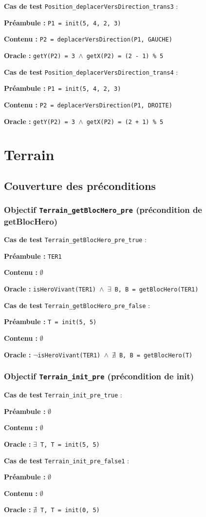 \documentclass{article}
\newcommand{\cmd}[1]{\texttt{#1}}
\newcommand{\lAND}{$\land$}
\newcommand{\lNOT}{$\lnot$}
\newcommand{\lEXISTS}{$\exists$}
\newcommand{\lNEXISTS}{$\nexists{}$}
\newcommand{\obj}[2]{\subsubsection*{\large{\textbf{Objectif {\cmd{#1} (#2)}}}}}
\newenvironment{cas}[1]
{
	\hspace{1em}\textbf{Cas de test} \cmd{#1} :
	\begin{list}{}{}
}{
	\end{list}\vspace{1em}
}
\newcommand{\pre}[1]{\item \textbf{Préambule :} \cmd{#1}}
\newcommand{\npre}{\item \textbf{Préambule :} $\emptyset$}
\newcommand{\ope}[1]{\item \textbf{Contenu :} \cmd{#1}}
\newcommand{\nope}{\item \textbf{Contenu :} $\emptyset$}
\newcommand{\ora}[1]{\item \textbf{Oracle :} \cmd{#1}}
\begin{document}
	\begin{cas} {Position\_deplacerVersDirection\_trans3}
		\pre{P1 = init(5, 4, 2, 3)}
		\ope{P2 = deplacerVersDirection(P1, GAUCHE)}
		\ora{getY(P2) = 3 \lAND{} getX(P2) = (2 - 1) \% 5}
	\end{cas}


	\begin{cas} {Position\_deplacerVersDirection\_trans4}
		\pre{P1 = init(5, 4, 2, 3)}
		\ope{P2 = deplacerVersDirection(P1, DROITE)}
		\ora{getY(P2) = 3 \lAND{} getX(P2) = (2 + 1) \% 5}
	\end{cas}

\clearpage{}





















\section{Terrain}

\subsection{Couverture des préconditions}

\obj{Terrain\_getBlocHero\_pre} {précondition de getBlocHero}
	\begin{cas} {Terrain\_getBlocHero\_pre\_true}
		\pre{TER1}
		\nope{}
		\ora{isHeroVivant(TER1) \lAND{} \lEXISTS{} B, B = getBlocHero(TER1)}
	\end{cas}

	\begin{cas} {Terrain\_getBlocHero\_pre\_false}
		\pre{T = init(5, 5)}
		\nope{}
		\ora{\lNOT{}isHeroVivant(TER1) \lAND{} \lNEXISTS{} B, B = getBlocHero(T)}
	\end{cas}

\obj{Terrain\_init\_pre} {précondition de init}
	\begin{cas} {Terrain\_init\_pre\_true}
		\npre{}
		\nope{}
		\ora{\lEXISTS{} T, T = init(5, 5)}
	\end{cas}

	\begin{cas} {Terrain\_init\_pre\_false1}
		\npre{}
		\nope{}
		\ora{\lNEXISTS{} T, T = init(0, 5)}
	\end{cas}
\end{document}
